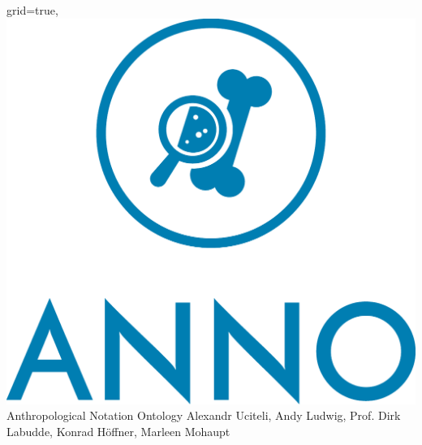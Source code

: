 \documentclass[portrait,final,a0paper,fontscale=0.320]{imiseposter}
\begin{document}
\begin{poster}%
  {grid=true,}
  {\hspace{5em}\includegraphics[height=0.105\textheight]{img/anno-logo-short-mediblue.pdf}}
  {Anthropological Notation Ontology}
  {Alexandr Uciteli, Andy Ludwig, Prof. Dirk Labudde, Konrad Höffner, Marleen Mohaupt}
  {%
  }


\end{poster}
\end{document}
